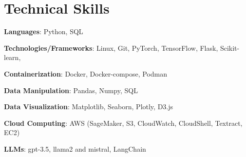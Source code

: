 \documentclass[letterpaper,10pt]{article}
\newcommand{\resumeItem}[1]{
  \item\small{
    {#1 \vspace{-2pt}}
  }
}
\begin{document}
%
\section{Technical Skills}
 \begin{itemize}
    \small{
\resumeItem{\textbf{Languages}{: Python, SQL}} \\
\resumeItem{\textbf{Technologies/Frameworks}{: Linux, Git, PyTorch, TensorFlow, Flask, Scikit-learn, }} \\
\resumeItem{\textbf{Containerization}{: Docker, Docker-compose, Podman}} \\
\resumeItem{\textbf{Data Manipulation}{: Pandas, Numpy, SQL}} \\
\resumeItem{\textbf{Data Visualization}{: Matplotlib, Seaborn, Plotly, D3.js}} \\
\resumeItem{\textbf{Cloud Computing}{: AWS (SageMaker, S3,  CloudWatch,  CloudShell,  Textract,  EC2) } }\\}
\resumeItem{\textbf{LLMs}{: gpt-3.5, llama2 and mistral, LangChain}}
 \end{itemize}
 \vspace{-16pt}
\end{document}

